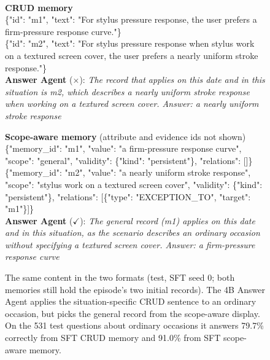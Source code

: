 \documentclass[11pt]{article}
\begin{document}
\begin{figure}[t]
\centering\small
{}\\[5pt]
\begin{minipage}[t]{0.485\textwidth}\raggedright
\textbf{CRUD memory}\\[2pt]
{\footnotesize\ttfamily \{"id": "m1", "text": "For stylus pressure response, the user prefers a firm-pressure response curve."\}\\
\{"id": "m2", "text": "For stylus pressure response when stylus work on a textured screen cover, the user prefers a nearly uniform stroke response."\}}\\[4pt]
\textbf{Answer Agent} ($\times$): \emph{The record that applies on this date and in this situation is m2, which describes a nearly uniform stroke response when working on a textured screen cover. Answer: a nearly uniform stroke response}
\end{minipage}\hfill
\begin{minipage}[t]{0.485\textwidth}\raggedright
\textbf{Scope-aware memory} (attribute and evidence ids not shown)\\[2pt]
{\footnotesize\ttfamily \{"memory\_id": "m1", "value": "a firm-pressure response curve", "scope": "general", "validity": \{"kind": "persistent"\}, "relations": []\}\\
\{"memory\_id": "m2", "value": "a nearly uniform stroke response", "scope": "stylus work on a textured screen cover", "validity": \{"kind": "persistent"\}, "relations": [\{"type": "EXCEPTION\_TO", "target": "m1"\}]\}}\\[4pt]
\textbf{Answer Agent} ($\checkmark$): \emph{The general record (m1) applies on this date and in this situation, as the scenario describes an ordinary occasion without specifying a textured screen cover. Answer: a firm-pressure response curve}
\end{minipage}
\caption{The same content in the two formats (test, SFT seed 0; both memories still hold the episode's two initial records). The 4B Answer Agent applies the situation-specific CRUD sentence to an ordinary occasion, but picks the general record from the scope-aware display. On the 531 test questions about ordinary occasions it answers 79.7\% correctly from SFT CRUD memory and 91.0\% from SFT scope-aware memory.}
\label{fig:example}
\end{figure}
\end{document}
